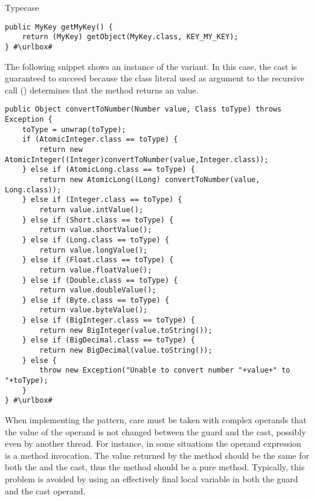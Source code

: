 \begin{pattern}{Typecase}
\def\urlvar{http://bit.ly/smartdevicelink_sdl_android_2EjJiaq}
\begin{verbatim}
public MyKey getMyKey() {
    return (MyKey) getObject(MyKey.class, KEY_MY_KEY);
} #\urlbox#
\end{verbatim}

The following snippet shows an instance of the  variant. 
In this case, the cast is guaranteed to succeed because the class literal used as argument to the recursive call () determines that the method returns an  value.
\def\urlvar{http://bit.ly/apache_karaf_2HE55gE}
\begin{verbatim}
public Object convertToNumber(Number value, Class toType) throws Exception {
    toType = unwrap(toType);
    if (AtomicInteger.class == toType) {
        return new AtomicInteger((Integer)convertToNumber(value,Integer.class));
    } else if (AtomicLong.class == toType) {
        return new AtomicLong((Long) convertToNumber(value, Long.class));
    } else if (Integer.class == toType) {
        return value.intValue();
    } else if (Short.class == toType) {
        return value.shortValue();
    } else if (Long.class == toType) {
        return value.longValue();
    } else if (Float.class == toType) {
        return value.floatValue();
    } else if (Double.class == toType) {
        return value.doubleValue();
    } else if (Byte.class == toType) {
        return value.byteValue();
    } else if (BigInteger.class == toType) {
        return new BigInteger(value.toString());
    } else if (BigDecimal.class == toType) {
        return new BigDecimal(value.toString());
    } else {
        throw new Exception("Unable to convert number "+value+" to "+toType);
    }
} #\urlbox#
\end{verbatim}


\detection{}
When implementing the pattern,
care must be taken with complex operands that the value of the operand is
not changed between the guard and the cast, possibly even by another thread.
For instance, in some situations the operand expression is a method invocation.
The value returned by the method should be the same for both the
 and the cast, thus the method should be a pure method.
Typically, this problem is avoided by using an effectively final local variable in both the guard and the cast operand.


\end{pattern}
